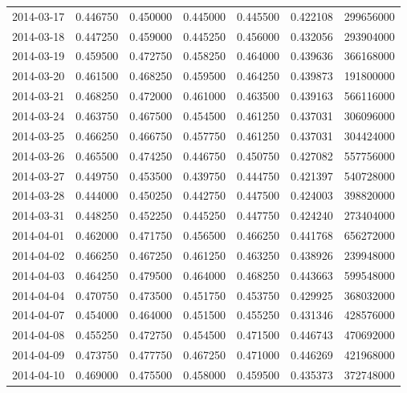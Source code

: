 \begin{tabular}{lrrrrrr}
2014-03-17 &    0.446750 &    0.450000 &    0.445000 &    0.445500 &    0.422108 &   299656000 \\
2014-03-18 &    0.447250 &    0.459000 &    0.445250 &    0.456000 &    0.432056 &   293904000 \\
2014-03-19 &    0.459500 &    0.472750 &    0.458250 &    0.464000 &    0.439636 &   366168000 \\
2014-03-20 &    0.461500 &    0.468250 &    0.459500 &    0.464250 &    0.439873 &   191800000 \\
2014-03-21 &    0.468250 &    0.472000 &    0.461000 &    0.463500 &    0.439163 &   566116000 \\
2014-03-24 &    0.463750 &    0.467500 &    0.454500 &    0.461250 &    0.437031 &   306096000 \\
2014-03-25 &    0.466250 &    0.466750 &    0.457750 &    0.461250 &    0.437031 &   304424000 \\
2014-03-26 &    0.465500 &    0.474250 &    0.446750 &    0.450750 &    0.427082 &   557756000 \\
2014-03-27 &    0.449750 &    0.453500 &    0.439750 &    0.444750 &    0.421397 &   540728000 \\
2014-03-28 &    0.444000 &    0.450250 &    0.442750 &    0.447500 &    0.424003 &   398820000 \\
2014-03-31 &    0.448250 &    0.452250 &    0.445250 &    0.447750 &    0.424240 &   273404000 \\
2014-04-01 &    0.462000 &    0.471750 &    0.456500 &    0.466250 &    0.441768 &   656272000 \\
2014-04-02 &    0.466250 &    0.467250 &    0.461250 &    0.463250 &    0.438926 &   239948000 \\
2014-04-03 &    0.464250 &    0.479500 &    0.464000 &    0.468250 &    0.443663 &   599548000 \\
2014-04-04 &    0.470750 &    0.473500 &    0.451750 &    0.453750 &    0.429925 &   368032000 \\
2014-04-07 &    0.454000 &    0.464000 &    0.451500 &    0.455250 &    0.431346 &   428576000 \\
2014-04-08 &    0.455250 &    0.472750 &    0.454500 &    0.471500 &    0.446743 &   470692000 \\
2014-04-09 &    0.473750 &    0.477750 &    0.467250 &    0.471000 &    0.446269 &   421968000 \\
2014-04-10 &    0.469000 &    0.475500 &    0.458000 &    0.459500 &    0.435373 &   372748000 \\

\end{tabular}

